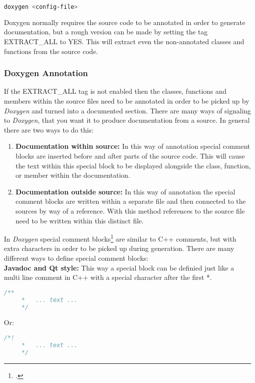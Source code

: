 \begin{lstlisting}[language=bash]
    doxygen <config-file>
\end{lstlisting}

Doxygen normally requires the source code to be annotated in order to generate documentation, but a rough version can be made by setting the tag EXTRACT\_ALL to YES.
This will extract even the non-annotated classes and functions from the source code.

\subsubsection{Doxygen Annotation}

If the EXTRACT\_ALL tag is not enabled then the classes, functions and members within the source files need to be annotated in order to be picked up by \textit{Doxygen}
and turned into a documented section. There are many ways of signaling to \textit{Doxygen}, that you want it to produce documentation from a source. In general there
are two ways to do this:
\begin{enumerate}
    \item \textbf{Documentation within source:} In this way of annotation special comment blocks are inserted before and after parts of the source code. 
                This will cause the text within this special block to be displayed alongside the class, function, or member within the documentation.
    \item \textbf{Documentation outside source:} In this way of annotation the special comment blocks are written within a separate file and then connected 
                to the sources by way of a reference. With this method references to the source file need to be written within this distinct file.
\end{enumerate}

In \textit{Doxygen} special comment blocks\footcite{doxygen_manual_comment_blocks} are similar to C++ comments, but with extra characters in order to be picked up during generation. There are many different 
ways to define special comment blocks:\\

\textbf{Javadoc and Qt style:} This way a special block can be definied just like a multi line comment in C++ with a special character after the first *.

\begin{minipage}{\textwidth}
\begin{lstlisting}[language=Doxygen]
    /**
     *   ... text ...
     */
\end{lstlisting}
Or:
\begin{lstlisting}[language=Doxygen]
    /*!
     *   ... text ...
     */
\end{lstlisting}
\end{minipage}
   
